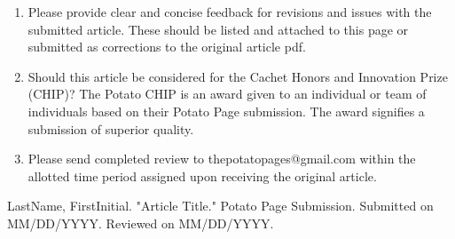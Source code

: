 \documentclass[10pt]{article}
\begin{document}
\begin{enumerate}
\begin{enumerate}
\begin{itemize}
		\end{itemize}
	\end{enumerate}
	\item Please provide clear and concise feedback for revisions and issues with the submitted article. These should be listed and attached to this page or submitted as corrections to the original article pdf.
	\item Should this article be considered for the Cachet Honors and Innovation Prize (CHIP)? The Potato CHIP is an award given to an individual or team of individuals based on their Potato Page submission. The award signifies a submission of superior quality.
	\item Please send completed review to thepotatopages@gmail.com within the allotted time period assigned upon receiving the original article.
\end{enumerate}




\begin{thebibliography}{9}
	{\footnotesize
	 LastName, FirstInitial. "Article Title." Potato Page Submission. Submitted on MM/DD/YYYY. Reviewed on MM/DD/YYYY.
	}
\end{thebibliography}

\end{document}
